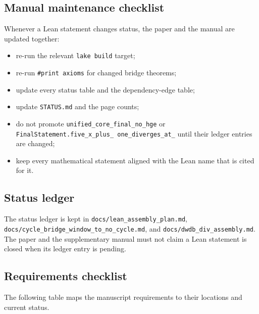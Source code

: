 \subsection{Manual maintenance checklist}

Whenever a Lean statement changes status, the paper and the manual are
updated together:
\begin{itemize}[leftmargin=*]
\item re-run the relevant \texttt{lake build} target;
\item re-run \texttt{\#print axioms} for changed bridge theorems;
\item update every status table and the dependency-edge table;
\item update \texttt{STATUS.md} and the page counts;
\item do not promote \texttt{unified\_core\_final\_no\_hge} or
  \texttt{FinalStatement.five\_\allowbreak x\_\allowbreak plus\_\allowbreak
  one\_\allowbreak diverges\_\allowbreak at\_} until
  their ledger entries are changed;
\item keep every mathematical statement aligned with the Lean name
  that is cited for it.
\end{itemize}

\subsection{Status ledger}

The status ledger is kept in \texttt{docs/lean\_assembly\_plan.md},
\texttt{docs/cycle\_bridge\_window\_to\_no\_cycle.md}, and
\texttt{docs/dwdb\_div\_assembly.md}.  The paper and the supplementary manual
must not claim a Lean statement is closed when its ledger entry is
pending.

\subsection{Requirements checklist}

The following table maps the manuscript requirements to their
locations and current status.

